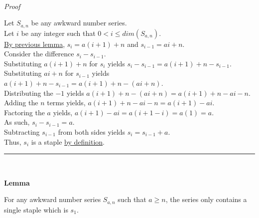 \documentclass[a4paper,12pt]{article}
\begin{document}
\noindent \\
\textit{Proof}

\noindent Let $S_{a, n}$ be any awkward number series.\\

\noindent Let $i$ be any integer such that $0 < i \leq dim(S_{a, n})$.\\

\noindent \hyperlink{lemma:basis_lengths}{By previous lemma}, $s_i = a(i + 1) + n$ and $s_{i - 1} = ai + n$.\\

\noindent Consider the difference $s_i - s_{i - 1}$.\\

\noindent Substituting $a(i + 1) + n$ for $s_i$ yields $s_i - s_{i - 1} = a(i + 1) + n - s_{i - 1}$.\\

\noindent Substituting $ai + n$ for $s_{i - 1}$ yields $a(i + 1) + n - s_{i - 1} = a(i + 1) + n - (ai + n)$.\\

\noindent Distributing the $-1$ yields $a(i + 1) + n - (ai + n) = a(i + 1) + n - ai - n$.\\

\noindent Adding the $n$ terms yields, $a(i + 1) + n - ai - n = a(i + 1) - ai$.\\

\noindent Factoring the $a$ yields, $a(i + 1) - ai = a(i + 1 - i) = a(1) = a$.\\

\noindent As such, $s_i - s_{i - 1} = a$.\\

\noindent Subtracting $s_{i - 1}$ from both sides yields $s_i = s_{i - 1} + a$.\\

\noindent Thus, $s_i$ is a staple \hyperlink{definition:staple}{by definition}.



\begin{center}
\noindent\rule{8cm}{0.4pt}
\end{center}
\noindent \\








\label{lemma:only_staple}
\hypertarget{lemma:only_staple}{}
\begin{tcolorbox}
\textbf{Lemma}

\noindent For any awkward number series $S_{a,n}$ such that $a \geq n$, the series only contains a single staple which is $s_1$.

\end{tcolorbox}
\end{document}
